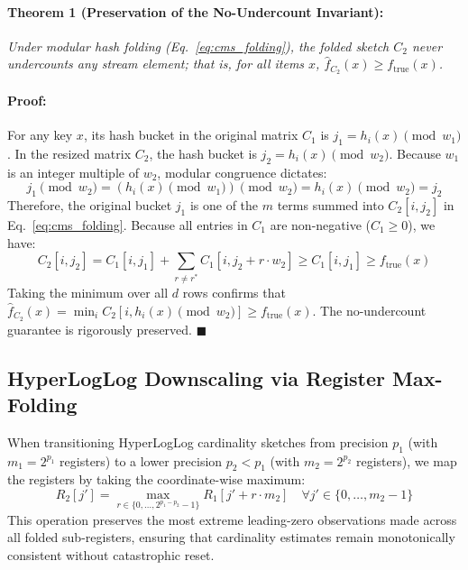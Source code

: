 \paragraph{Theorem 1 (Preservation of the No-Undercount Invariant):}
\textit{Under modular hash folding (Eq.~\ref{eq:cms_folding}), the folded sketch $C_2$ never undercounts any stream element; that is, for all items $x$, $\hat{f}_{C_2}(x) \ge f_{\text{true}}(x)$.}

\paragraph{Proof:}
For any key $x$, its hash bucket in the original matrix $C_1$ is $j_1 = h_i(x) \pmod{w_1}$. In the resized matrix $C_2$, the hash bucket is $j_2 = h_i(x) \pmod{w_2}$. Because $w_1$ is an integer multiple of $w_2$, modular congruence dictates:
\begin{equation}
    j_1 \pmod{w_2} = (h_i(x) \pmod{w_1}) \pmod{w_2} = h_i(x) \pmod{w_2} = j_2
\end{equation}
Therefore, the original bucket $j_1$ is one of the $m$ terms summed into $C_2[i, j_2]$ in Eq.~\ref{eq:cms_folding}. Because all entries in $C_1$ are non-negative ($C_1 \ge 0$), we have:
\begin{equation}
    C_2[i, j_2] = C_1[i, j_1] + \sum_{r \ne r^*} C_1[i, j_2 + r \cdot w_2] \ge C_1[i, j_1] \ge f_{\text{true}}(x)
\end{equation}
Taking the minimum over all $d$ rows confirms that $\hat{f}_{C_2}(x) = \min_i C_2[i, h_i(x) \pmod{w_2}] \ge f_{\text{true}}(x)$. The no-undercount guarantee is rigorously preserved. $\blacksquare$

\subsection{HyperLogLog Downscaling via Register Max-Folding}
When transitioning HyperLogLog cardinality sketches from precision $p_1$ (with $m_1 = 2^{p_1}$ registers) to a lower precision $p_2 < p_1$ (with $m_2 = 2^{p_2}$ registers), we map the registers by taking the coordinate-wise maximum:
\begin{equation}
    R_2[j'] = \max_{r \in \{0, \dots, 2^{p_1 - p_2} - 1\}} R_1[j' + r \cdot m_2] \quad \forall j' \in \{0, \dots, m_2 - 1\}
\end{equation}
This operation preserves the most extreme leading-zero observations made across all folded sub-registers, ensuring that cardinality estimates remain monotonically consistent without catastrophic reset.


